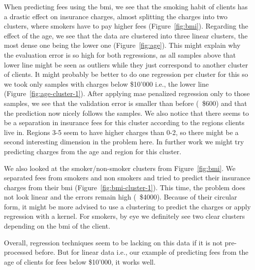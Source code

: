 \documentclass[10pt]{article}
\newenvironment{exercise}[2][Exercise]{\begin{trivlist}
  \item[\hskip \labelsep {\bfseries #1}\hskip \labelsep {\bfseries #2.}]}{\end{trivlist}}
\begin{document}
\begin{exercise}{8}
When predicting fees using the bmi, we see that the smoking habit of clients has a drastic effect on insurance charges, almost splitting the charges into two clusters, where smokers have to pay higher fees (Figure~\ref{fig:bmi}). Regarding the effect of the age, we see that the data are clustered into three linear clusters, the most dense one being the lower one (Figure~\ref{fig:age}). This might explain why the evaluation error is so high for both regressions, as all samples above that lower line might be seen as outliers while they just correspond to another cluster of clients. It might probably be better to do one regression per cluster for this so we took only samples with charges below \$10'000 i.e., the lower line (Figure~\ref{fig:age-cluster-1}). After applying mae penalized regression only to those samples, we see that the validation error is smaller than before (~\$600) and that the prediction now nicely follows the samples. We also notice that there seems to be a separation in insurance fees for this cluster according to the regions clients live in. Regions 3-5 seem to have higher charges than 0-2, so there might be a second interesting dimension in the problem here. In further work we might try predicting charges from the age and region for this cluster. 

We also looked at the smoker/non-smoker clusters from Figure~\ref{fig:bmi}. We separated fees from smokers and non smokers and tried to predict their insurance charges from their bmi (Figure~\ref{fig:bmi-cluster-1}). This time, the problem does not look linear and the errors remain high (~\$4000). Because of their circular form, it might be more advised to use a clustering to predict the charges or apply regression with a kernel. For smokers, by eye we definitely see two clear clusters depending on the bmi of the client.


Overall, regression techniques seem to be lacking on this data if it is not pre-processed before. But for linear data i.e., our example of predicting fees from the age of clients for fees below \$10'000, it works well.  





\end{exercise}
\end{document}
